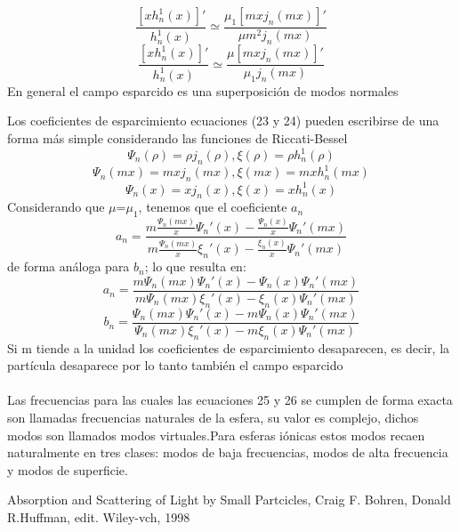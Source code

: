 \documentclass[11pt]{article}
\begin{document}
\begin{equation}
\frac{[xh_{n}^{1}(x)]'}{h_{n}^{1}(x)}\simeq \frac{\mu_{1}[mxj_{n}(mx)]'}{\mu m^2 j_{n}(mx)}
\end{equation}
\begin{equation}
\frac{[xh_{n}^{1}(x)]'}{h_{n}^{1}(x)}\simeq \frac{\mu [mxj_{n}(mx)]'}{\mu_{1} j_{n}(mx)}
\end{equation}
En general el campo esparcido es una superposición de modos normales














Los coeficientes de esparcimiento ecuaciones (23 y 24) pueden escribirse de una forma más simple considerando las funciones de Riccati-Bessel 
\begin{equation}
\Psi_{n}(\rho)=\rho j_{n}(\rho) , \xi(\rho)=\rho h_{n}^{1}(\rho)
\end{equation}
\begin{equation}
\Psi_{n}(mx)=mx j_{n}(mx) , \xi(mx)=mx h_{n}^{1}(mx)
\end{equation}
\begin{equation}
\Psi_{n}(x)=x j_{n}(x) , \xi(x)=x h_{n}^{1}(x)
\end{equation}
Considerando que $\mu$=$\mu_{1}$, tenemos que el coeficiente $a_{n}$
\begin{equation}
a_{n}=\frac{m \frac{\Psi_{n}(mx) }{x}\Psi_{n}'(x)-\frac{\Psi_{n}(x)}{x}\Psi_{n}'(mx)}{m \frac{\Psi_{n}(mx)}{x}\xi_{n}'(x)-\frac{\xi_{n}(x)}{x}\Psi_{n}'(mx)}
\end{equation}
de forma análoga para $b_{n}$; lo que resulta en:
\begin{equation}
a_{n}=\frac{m \Psi_{n}(mx)\Psi_{n}'(x)-\Psi_{n}(x)\Psi_{n}'(mx)}{m \Psi_{n}(mx)\xi_{n}'(x)-\xi_{n}(x)\Psi_{n}'(mx)}
\end{equation}
\begin{equation}
b_{n}=\frac{ \Psi_{n}(mx)\Psi_{n}'(x)-m\Psi_{n}(x)\Psi_{n}'(mx)}{ \Psi_{n}(mx)\xi_{n}'(x)-m\xi_{n}(x)\Psi_{n}'(mx)}
\end{equation}
Si m tiende a la unidad los coeficientes de esparcimiento desaparecen, es decir, la partícula desaparece por lo tanto también el campo esparcido
\\
\\
Las frecuencias para las cuales las ecuaciones 25 y 26 se cumplen de forma exacta son llamadas frecuencias naturales de la esfera, su valor es complejo, dichos modos son llamados modos virtuales.Para esferas iónicas estos modos recaen naturalmente en tres clases: modos de baja frecuencias, modos de alta frecuencia y modos de superficie.

\begin{thebibliography}{1}
Absorption and Scattering of Light by Small Partcicles, Craig F. Bohren, Donald R.Huffman, edit. Wiley-vch, 1998
\end{thebibliography}
\end{document}
